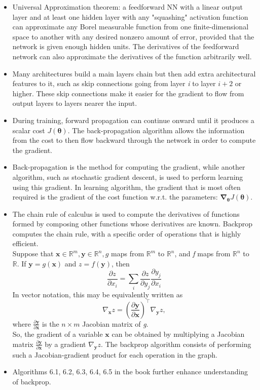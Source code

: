 \documentclass{article}
\begin{document}
\begin{itemize}
\item Universal Approximation theorem: a feedforward NN with a linear output layer and at least one hidden layer with any "squashing" activation function can approximate any Borel measurable function from one finite-dimensional space to another with any desired nonzero amount of error, provided that the network is given enough hidden units. The derivatives of the feedforward network can also approximate the derivatives of the function arbitrarily well.
\item Many architectures build a main layers chain but then add extra architectural features to it, such as skip connections going from layer \textit{i} to layer \(i + 2\) or higher. These skip connections make it easier for the gradient to flow from output layers to layers nearer the input.
\item During training, forward propagation can continue onward until it produces a scalar cost \(J(\boldsymbol{\theta})\). The back-propagation algorithm allows the information from the cost to then flow backward through the network in order to compute the gradient.
\item Back-propagation is the method for computing the gradient, while another algorithm, such as stochastic gradient descent, is used to perform learning using this gradient. In learning algorithm, the gradient that is most often required is the gradient of the cost function w.r.t. the parameters: \(\boldsymbol{\nabla_{\theta}}J(\boldsymbol{\theta})\).
\item The chain rule of calculus is used to compute the derivatives of functions formed by composing other functions whose derivatives are known. Backprop computes the chain rule, with a specific order of operations that is highly efficient.\\Suppose that \(\boldsymbol{x} \in \mathbb{R}^m, \boldsymbol{y} \in \mathbb{R}^n, g\) maps from \(\mathbb{R}^m\) to \(\mathbb{R}^n\), and \textit{f} maps from \(\mathbb{R}^n\) to \(\mathbb{R}\). If \(\boldsymbol{y} = g(\boldsymbol{x})\) and \(z = f(\boldsymbol{y})\), then
\[
	\frac{\partial z}{\partial x_i} = \sum_i {\frac{\partial z}{\partial y_j}\frac{\partial y_j}{\partial x_i}}
\]
In vector notation, this may be equivalently written as
\[
	\nabla_{\boldsymbol{x}}z = \left( \frac{\partial \boldsymbol{y}}{\partial \boldsymbol{x}} \right)^\top \nabla_{\boldsymbol{y}}z,	
\]
where \(\frac{\partial \boldsymbol{y}}{\partial \boldsymbol{x}}\) is the \(n \times m\) Jacobian matrix of \textit{g}.\\So, the gradient of a variable \(\boldsymbol{x}\) can be obtained by multiplying a Jacobian matrix \(\frac{\partial \boldsymbol{y}}{\partial \boldsymbol{x}}\) by a gradient \(\nabla_{\boldsymbol{y}}z\). The backprop algorithm consists of performing such a Jacobian-gradient product for each operation in the graph.
\item Algorithms 6.1, 6.2, 6.3, 6.4, 6.5 in the book further enhance understanding of backprop.
\end{itemize}
\end{document}

